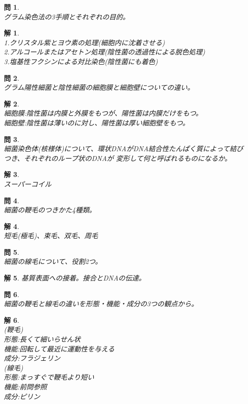 \documentclass{jsarticle}
\newtheorem{pro}{問}[section]
\newtheorem{ans}{解}[section]
\begin{document}
\begin{pro}~\\
    グラム染色法の3手順とそれぞれの目的。
\end{pro}
\begin{ans}~\\
    1.クリスタル紫とヨウ素の処理(細胞内に沈着させる)\\
    2.アルコールまたはアセトン処理(陰性菌の透過性による脱色処理)\\
    3.塩基性フクシンによる対比染色(陰性菌にも着色)
\end{ans}

\begin{pro}~\\
    グラム陽性細菌と陰性細菌の細胞膜と細胞壁についての違い。
\end{pro}
\begin{ans}~\\
    細胞膜:陰性菌は内膜と外膜をもつが、陽性菌は内膜だけをもつ。\\
    細胞壁:陰性菌は薄いのに対し、陽性菌は厚い細胞壁をもつ。
\end{ans}

\begin{pro}~\\
    細菌染色体(核様体)について、環状DNAがDNA結合性たんぱく質によって結びつき、それぞれのループ状のDNAが
    変形して何と呼ばれるものになるか。
\end{pro}
\begin{ans}~\\
    スーパーコイル
\end{ans}

\begin{pro}~\\
    細菌の鞭毛のつきかた4種類。
\end{pro}
\begin{ans}~\\
    短毛(極毛)、束毛、双毛、周毛
\end{ans}

\begin{pro}~\\
    細菌の線毛について、役割2つ。
\end{pro}
\begin{ans}
基質表面への接着。接合とDNAの伝達。
\end{ans}

\begin{pro}~\\
    細菌の鞭毛と線毛の違いを形態・機能・成分の3つの観点から。
\end{pro}
\begin{ans}~\\
    (鞭毛)\\
    形態:長くて細いらせん状\\
    機能:回転して最近に運動性を与える\\
    成分:フラジェリン\\
    (線毛)\\
    形態:まっすぐで鞭毛より短い\\
    機能:前問参照\\
    成分:ピリン
\end{ans}
\end{document}
